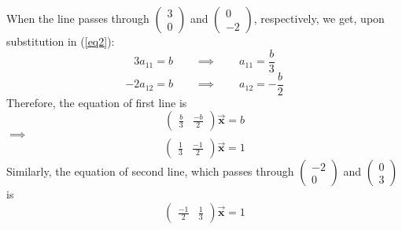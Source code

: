 \documentclass[12pt]{article}
\begin{document}
\noindent
When the line passes through 
$\displaystyle
\begin{pmatrix}
	3 \\ 0
\end{pmatrix}$
and 
$\displaystyle
\begin{pmatrix}
	0 \\ -2
\end{pmatrix}$, respectively,
we get, upon substitution in (\ref{eq2}):
	\[ 3 a_{11} = b \qquad \implies \qquad a_{11} = \frac{b}{3} \]
	\[-2 a_{12} = b \qquad \implies \qquad a_{12} =-\frac{b}{2} \]
Therefore, the equation of first line is
\begin{equation*}
\begin{pmatrix}
	\displaystyle \frac{b}{3} &
	\displaystyle \frac{-b}{2}
\end{pmatrix}
	\vec{\mathbf{x}} = b
\end{equation*}
%
$\implies$
\begin{equation}
\begin{pmatrix}
	\displaystyle \frac{1}{3} &
	\displaystyle \frac{-1}{2}
\end{pmatrix}
	\vec{\mathbf{x}} = 1
\end{equation}
Similarly, the equation of second line, which passes through 
$\displaystyle
\begin{pmatrix}
	-2 \\ 0
\end{pmatrix}$
and 
$\displaystyle
\begin{pmatrix}
	0 \\ 3
\end{pmatrix}$
is 
\begin{equation}
\begin{pmatrix}
	\displaystyle \frac{-1}{2} &
	\displaystyle \frac{1}{3}
\end{pmatrix}
	\vec{\mathbf{x}} = 1
\end{equation}


\end{document}
